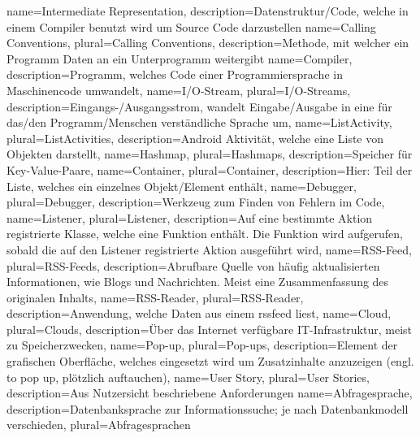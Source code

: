 {
    name={Intermediate Representation},
    description={Datenstruktur/Code, welche in einem Compiler benutzt wird um Source Code darzustellen}
}
{
    name={Calling Conventions},
    plural={Calling Conventions},
    description={Methode, mit welcher ein Programm Daten an ein Unterprogramm weitergibt}
}
{
    name={Compiler},
    description={Programm, welches Code einer Programmiersprache in Maschinencode umwandelt},
}
{
    name={I/O-Stream},
    plural={I/O-Streams},
    description={Eingangs-/Ausgangsstrom, wandelt Eingabe/Ausgabe in eine für das/den Programm/Menschen verständliche Sprache um},
}
{
    name={ListActivity},
    plural={ListActivities},
    description={Android Aktivität, welche eine Liste von Objekten darstellt},
}
{
    name={Hashmap},
    plural={Hashmaps},
    description={Speicher für Key-Value-Paare},
}
{
    name={Container},
    plural={Container},
    description={Hier: Teil der Liste, welches ein einzelnes Objekt/Element enthält},
}
{
    name={Debugger},
    plural={Debugger},
    description={Werkzeug zum Finden von Fehlern im Code},
}
{
    name={Listener},
    plural={Listener},
    description={Auf eine bestimmte Aktion registrierte Klasse, welche eine Funktion enthält. Die Funktion wird aufgerufen, sobald die auf den Listener registrierte Aktion ausgeführt wird},
}
{
    name={RSS-Feed},
    plural={RSS-Feeds},
    description={Abrufbare Quelle von häufig aktualisierten Informationen, wie Blogs und Nachrichten. Meist eine Zusammenfassung des originalen Inhalts},
}
{
    name={RSS-Reader},
    plural={RSS-Reader},
    description={Anwendung, welche Daten aus einem \gls{rssfeed} liest},
}
{
    name={Cloud},
    plural={Clouds},
    description={Über das Internet verfügbare IT-Infrastruktur, meist zu Speicherzwecken},
}
{
    name={Pop-up},
    plural={Pop-ups},
    description={Element der grafischen Oberfläche, welches eingesetzt wird um Zusatzinhalte anzuzeigen (engl. \glqq{}to pop up\grqq{}, \glqq{}plötzlich auftauchen\grqq{})},
}
{
    name={User Story},
    plural={User Stories},
    description={Aus Nutzersicht beschriebene Anforderungen}
}
{
    name={Abfragesprache},
    description={Datenbanksprache zur Informationssuche; je nach Datenbankmodell verschieden},
    plural={Abfragesprachen}
}

